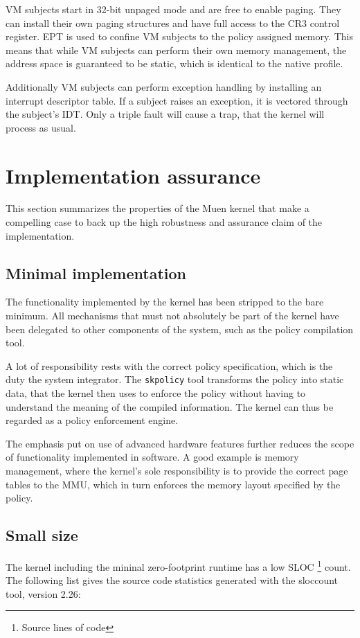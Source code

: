 VM subjects start in 32-bit unpaged mode and are free to enable paging. They can
install their own paging structures and have full access to the CR3 control
register. EPT is used to confine VM subjects to the policy assigned memory. This
means that while VM subjects can perform their own memory management, the
address space is guaranteed to be static, which is identical to the native
profile.

Additionally VM subjects can perform exception handling by installing an
interrupt descriptor table. If a subject raises an exception, it is vectored
through the subject's IDT. Only a triple fault will cause a trap, that the
kernel will process as usual.

\section{Implementation assurance}
This section summarizes the properties of the Muen kernel that make a compelling
case to back up the high robustness and assurance claim of the implementation.

\subsection{Minimal implementation}
The functionality implemented by the kernel has been stripped to the bare
minimum. All mechanisms that must not absolutely be part of the kernel have been
delegated to other components of the system, such as the policy compilation
tool.

A lot of responsibility rests with the correct policy specification, which is
the duty the system integrator. The \texttt{skpolicy} tool transforms the policy
into static data, that the kernel then uses to enforce the policy without having
to understand the meaning of the compiled information. The kernel can thus be
regarded as a policy enforcement engine.

The emphasis put on use of advanced hardware features further reduces the scope
of functionality implemented in software. A good example is memory management,
where the kernel's sole responsibility is to provide the correct page tables to
the MMU, which in turn enforces the memory layout specified by the policy.

\subsection{Small size}
The kernel including the mininal zero-footprint runtime has a low SLOC
\footnote{Source lines of code} count. The following list gives the source code
statistics generated with the sloccount tool, version 2.26:

